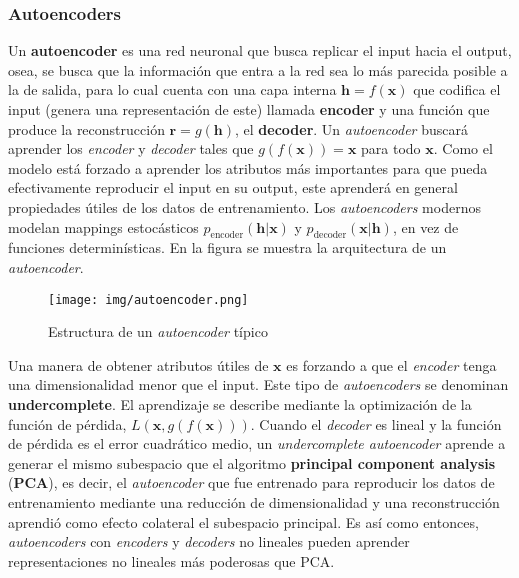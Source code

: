 \subsubsection{Autoencoders}

Un \textbf{autoencoder} es una red neuronal que busca replicar el input hacia el output, osea, se busca que la información que entra a la red sea lo más parecida posible a la de salida, para lo cual cuenta con una capa interna $\bm{h} = f(\bm{x})$ que codifica el input (genera una representaci\'on de este) llamada \textbf{encoder} y una funci\'on que produce la reconstrucci\'on $\bm{r} = g(\bm{h})$, el \textbf{decoder}. Un \textit{autoencoder} buscar\'a aprender los \textit{encoder} y \textit{decoder} tales que $g(f(\bm{x})) = \bm{x}$ para todo $\bm{x}$. Como el modelo est\'a forzado a aprender los atributos m\'as importantes para que pueda efectivamente reproducir el input en su output, este aprender\'a en general propiedades \'utiles de los datos de entrenamiento. Los \textit{autoencoders} modernos modelan mappings estoc\'asticos $p_{\textrm{encoder}}(\bm{h}|\bm{x})$ y $p_{\textrm{decoder}}(\bm{x}|\bm{h})$, en vez de funciones determin\'isticas. En la figura se muestra la arquitectura de un \textit{autoencoder}.

\begin{figure}[H]
\captionsetup{font=small,labelfont=small}
\caption{Estructura de un \textit{autoencoder} t\'ipico}
\centering
\texttt{[image: img/autoencoder.png]}
\end{figure}

Una manera de obtener atributos \'utiles de $\bm{x}$ es forzando a que el \textit{encoder} tenga una dimensionalidad menor que el input. Este tipo de \textit{autoencoders} se denominan \textbf{undercomplete}. El aprendizaje se describe mediante la optimizaci\'on de la funci\'on de p\'erdida, $L(\bm{x}, g(f(\bm{x})))$. Cuando el \textit{decoder} es lineal y la funci\'on de p\'erdida es el error cuadr\'atico medio, un \textit{undercomplete autoencoder} aprende a generar el mismo subespacio que el algoritmo \textbf{principal component analysis} (\textbf{PCA}), es decir, el \textit{autoencoder} que fue entrenado para reproducir los datos de entrenamiento mediante una reducci\'on de dimensionalidad y una reconstrucci\'on aprendi\'o como efecto colateral el subespacio principal. Es as\'i como entonces, \textit{autoencoders} con \textit{encoders} y \textit{decoders} no lineales pueden aprender representaciones no lineales m\'as poderosas que PCA.

